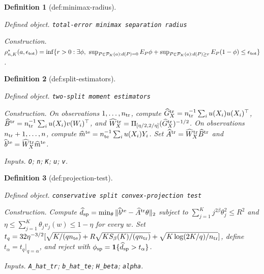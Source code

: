 \documentclass{article}
\newtheorem{definition}{Definition}
\begin{document}
\begin{definition}[def:minimax-radius]\label{def:minimax-radius}
\par\smallskip\noindent\emph{Defined object.} \texttt{total-\allowbreak{}error minimax separation radius}
\par\smallskip\noindent\emph{Construction.} \(\rho^\star_{n,K}(a,\epsilon_{\rm tot})=\inf\{r>0:\exists\phi,\ \sup_{P\in\mathcal P_K(a):d(P)=0}E_P\phi+\sup_{P\in\mathcal P_K(a):d(P)\ge r}E_P(1-\phi)\le\epsilon_{\rm tot}\}\).
\end{definition}

\begin{definition}[def:split-estimators]\label{def:split-estimators}
\par\smallskip\noindent\emph{Defined object.} \texttt{two-\allowbreak{}split moment estimators}
\par\smallskip\noindent\emph{Construction.} On observations \(1,\ldots,n_{\rm tr}\), compute \(\widehat G_X^{\rm tr}=n_{\rm tr}^{-1}\sum_i u(X_i)u(X_i)^\top\), \(\widehat B^{\rm tr}=n_{\rm tr}^{-1}\sum_i u(X_i)v(W_i)^\top\), and \(\widehat W_X^{\rm tr}=\Pi_{[\eta/2,2/\eta]}(\widehat G_X^{\rm tr})^{-1/2}\). On observations \(n_{\rm tr}+1,\ldots,n\), compute \(\widehat m^{\rm te}=n_{\rm te}^{-1}\sum_i u(X_i)Y_i\). Set \(\widehat A^{\rm tr}=\widehat W_X^{\rm tr}\widehat B^{\rm tr}\) and \(\widehat b^{\rm te}=\widehat W_X^{\rm tr}\widehat m^{\rm te}\).
\par\smallskip\noindent\emph{Inputs.} \texttt{O}; \texttt{n}; \texttt{K}; \texttt{u}; \texttt{v}.
\end{definition}

\begin{definition}[def:projection-test]\label{def:projection-test}
\par\smallskip\noindent\emph{Defined object.} \texttt{conservative split convex-\allowbreak{}projection test}
\par\smallskip\noindent\emph{Construction.} Compute \(\widehat d_{\rm sp}=\min_\theta\|\widehat b^{\rm te}-\widehat A^{\rm tr}\theta\|_2\) subject to \(\sum_{j=1}^Kj^{2\beta}\theta_j^2\le R^2\) and \(\eta\le\sum_{j=1}^K\theta_jv_j(w)\le1-\eta\) for every \(w\). Set \(t_q=32\eta^{-3/2}[\sqrt{K/(q n_{\rm te})}+R\sqrt{KS_\beta(K)/(q n_{\rm tr})}+\sqrt{K\log(2K/q)/n_{\rm tr}}]\), define \(t_\alpha=t_q\vert_{q=\alpha}\), and reject with \(\phi_{\rm sp}=\mathbf 1\{\widehat d_{\rm sp}>t_\alpha\}\).
\par\smallskip\noindent\emph{Inputs.} \texttt{A\_\allowbreak{}hat\_\allowbreak{}tr}; \texttt{b\_\allowbreak{}hat\_\allowbreak{}te}; \texttt{H\_\allowbreak{}beta}; \texttt{alpha}.
\end{definition}
\end{document}
